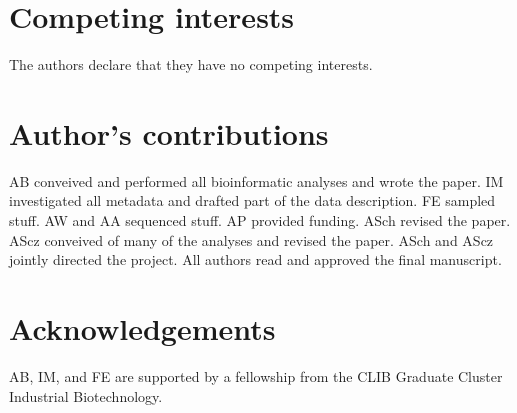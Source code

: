 \documentclass{bmcart}
\begin{document}
\begin{backmatter}

\section*{Competing interests}
The authors declare that they have no competing interests.

\section*{Author's contributions}
AB conveived and performed all bioinformatic analyses and wrote the paper.
IM investigated all metadata and drafted part of the data description.
FE sampled stuff.
AW and AA sequenced stuff.
AP provided funding.
ASch revised the paper.
AScz conveived of many of the analyses and revised the paper.
ASch and AScz jointly directed the project.
All authors read and approved the final manuscript.

\section*{Acknowledgements}
AB, IM, and FE are supported by a fellowship from the CLIB Graduate Cluster Industrial Biotechnology.




\end{backmatter}
\end{document}
